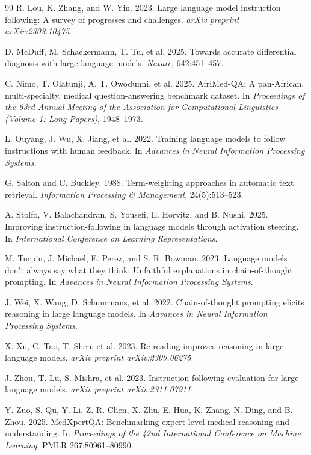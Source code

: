 \documentclass[10pt]{article}
\begin{document}
\begin{thebibliography}{99}
R. Lou, K. Zhang, and W. Yin. 2023. Large language model instruction following: A survey of progresses and challenges. \emph{arXiv preprint arXiv:2303.10475}.

D. McDuff, M. Schaekermann, T. Tu, et al. 2025. Towards accurate differential diagnosis with large language models. \emph{Nature}, 642:451--457.

C. Nimo, T. Olatunji, A. T. Owodunni, et al. 2025. AfriMed-QA: A pan-African, multi-specialty, medical question-answering benchmark dataset. In \emph{Proceedings of the 63rd Annual Meeting of the Association for Computational Linguistics (Volume 1: Long Papers)}, 1948--1973.

L. Ouyang, J. Wu, X. Jiang, et al. 2022. Training language models to follow instructions with human feedback. In \emph{Advances in Neural Information Processing Systems}.

G. Salton and C. Buckley. 1988. Term-weighting approaches in automatic text retrieval. \emph{Information Processing \& Management}, 24(5):513--523.

A. Stolfo, V. Balachandran, S. Yousefi, E. Horvitz, and B. Nushi. 2025. Improving instruction-following in language models through activation steering. In \emph{International Conference on Learning Representations}.

M. Turpin, J. Michael, E. Perez, and S. R. Bowman. 2023. Language models don't always say what they think: Unfaithful explanations in chain-of-thought prompting. In \emph{Advances in Neural Information Processing Systems}.

J. Wei, X. Wang, D. Schuurmans, et al. 2022. Chain-of-thought prompting elicits reasoning in large language models. In \emph{Advances in Neural Information Processing Systems}.

X. Xu, C. Tao, T. Shen, et al. 2023. Re-reading improves reasoning in large language models. \emph{arXiv preprint arXiv:2309.06275}.

J. Zhou, T. Lu, S. Mishra, et al. 2023. Instruction-following evaluation for large language models. \emph{arXiv preprint arXiv:2311.07911}.

Y. Zuo, S. Qu, Y. Li, Z.-R. Chen, X. Zhu, E. Hua, K. Zhang, N. Ding, and B. Zhou. 2025. MedXpertQA: Benchmarking expert-level medical reasoning and understanding. In \emph{Proceedings of the 42nd International Conference on Machine Learning}, PMLR 267:80961--80990.

\end{thebibliography}
\end{document}
